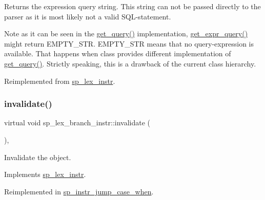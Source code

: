 \begin{DoxyReturn}{Returns}
the expression query string. This string can not be passed directly to the parser as it is most likely not a valid S\+QL-\/statement.
\end{DoxyReturn}
\begin{DoxyNote}{Note}
as it can be seen in the \mbox{\hyperlink{classsp__lex__instr_a8bbcccae8739634565f8be2134171b03}{get\+\_\+query()}} implementation, \mbox{\hyperlink{classsp__lex__branch__instr_a3693c3f9cc8fdf15092dcb3d4183075b}{get\+\_\+expr\+\_\+query()}} might return E\+M\+P\+T\+Y\+\_\+\+S\+TR. E\+M\+P\+T\+Y\+\_\+\+S\+TR means that no query-\/expression is available. That happens when class provides different implementation of \mbox{\hyperlink{classsp__lex__instr_a8bbcccae8739634565f8be2134171b03}{get\+\_\+query()}}. Strictly speaking, this is a drawback of the current class hierarchy. 
\end{DoxyNote}


Reimplemented from \mbox{\hyperlink{classsp__lex__instr_ad355d3ed08ae1fef4811fe6838ed78e2}{sp\+\_\+lex\+\_\+instr}}.

\mbox{\label{classsp__lex__branch__instr_a91d747da2e1068e2d6ac0fd7c06a4018}} 
\subsubsection{\texorpdfstring{invalidate()}{invalidate()}}
{\footnotesize\ttfamily virtual void sp\+\_\+lex\+\_\+branch\+\_\+instr\+::invalidate (\begin{DoxyParamCaption}{ }\end{DoxyParamCaption})\hspace{0.3cm}{\ttfamily [inline]}, {\ttfamily [virtual]}}

Invalidate the object. 

Implements \mbox{\hyperlink{classsp__lex__instr_ae9945d69ab5d91d6ce215f194beea882}{sp\+\_\+lex\+\_\+instr}}.



Reimplemented in \mbox{\hyperlink{classsp__instr__jump__case__when_a35195c6200f0d6e87bde67b83f5fd767}{sp\+\_\+instr\+\_\+jump\+\_\+case\+\_\+when}}.

\mbox{\label{classsp__lex__branch__instr_a22c35f1cd8a840a61e4881903ad6ff03}} 

